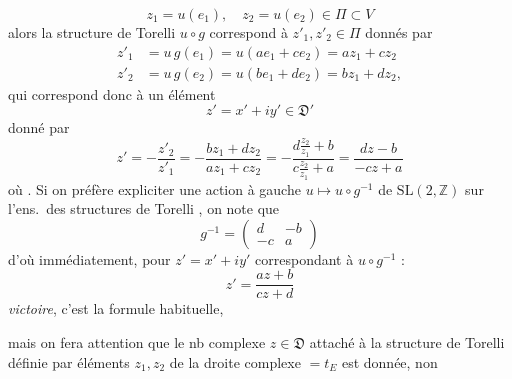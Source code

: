 \documentclass[11pt,a4paper]{article}
\begin{document}
\[
  z_1 = u(e_1), \quad z_2 = u(e_2) \in \Pi \subset V
\]
alors la structure de Torelli $u \circ g$ correspond à $z'_1, z'_2 \in \Pi$ donnés par
\[
  \begin{aligned}
    z'_1 &= u\,g(e_1) = u(a e_1 + c e_2) = a z_1 + c z_2 \\
    z'_2 &= u\,g(e_2) = u(b e_1 + d e_2) = b z_1 + d z_2 ,
  \end{aligned}
\]
qui correspond donc à un élément
\[
  z' = x' + i y' \in \mathfrak{D}'
\]
donné par
\[
  z' = -\frac{z'_2}{z'_1} = -\frac{b z_1 + d z_2}{a z_1 + c z_2}
  = -\frac{d \frac{z_2}{z_1} + b}{c \frac{z_2}{z_1} + a}
  = \frac{d z - b}{-c z + a} \tag{25}
\]
où \struck{\ill{}}. Si on \struck{\ill{}} préfère expliciter une action à gauche
$u \mapsto u \circ g^{-1}$ de $\mathrm{SL}(2, \mathbb{Z})$ sur l'ens.\ des structures de Torelli
, on note que
\[
  g^{-1} = \begin{pmatrix} d & -b \\ -c & a \end{pmatrix}
\]
 d'où immédiatement, pour $z' = x' + i y'$ correspondant à $u \circ g^{-1}$ :
\[
  z' = \frac{a z + b}{c z + d} \tag{25 bis}
\]
\emph{victoire}, c'est la formule habituelle,

mais on fera attention que le nb complexe $z \in \mathfrak{D}$ attaché à la structure de Torelli
définie par   éléments $z_1, z_2$ de la droite complexe
\struck{\ill{}} $= t_E$ est donnée, non
\end{document}
